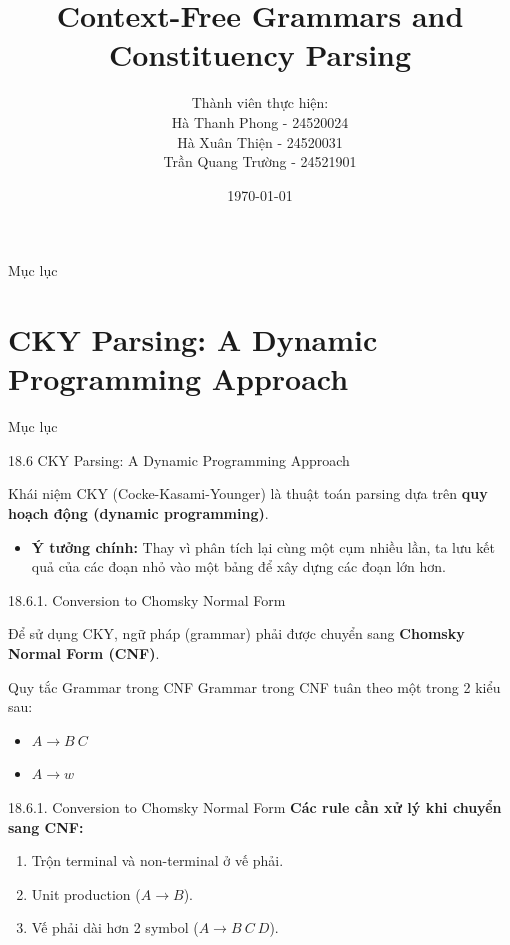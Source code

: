 \documentclass[11pt]{beamer}
\author[University of Information Technology]{Thành viên thực hiện: \\ Hà Thanh Phong - 24520024 \\ Hà Xuân Thiện - 24520031 \\ Trần Quang Trường - 24521901}
\title[Chaper 18]{Context-Free Grammars and Constituency Parsing}
\institute[]{University of Information Technology - VNUHCM}
\date{\today}
\begin{document}
	
	\begin{frame}
		\titlepage
	\end{frame}
	
	\begin{frame}{Mục lục}
		\tableofcontents[hideallsubsections]
	\end{frame}


	\section{CKY Parsing: A Dynamic Programming Approach}
	\begin{frame}{Mục lục}
		\tableofcontents[currentsection]
	\end{frame}

	\begin{frame}{18.6 CKY Parsing: A Dynamic Programming Approach}
		\begin{block}{Khái niệm}
			CKY (Cocke-Kasami-Younger) là thuật toán parsing dựa trên \textbf{quy hoạch động (dynamic programming)}.
		\end{block}
		\begin{itemize}
			\item \textbf{Ý tưởng chính:} Thay vì phân tích lại cùng một cụm nhiều lần, ta lưu kết quả của các đoạn nhỏ vào một bảng để xây dựng các đoạn lớn hơn.
		\end{itemize}
	\end{frame}
	
	\begin{frame}{18.6.1. Conversion to Chomsky Normal Form}
		
		Để sử dụng CKY, ngữ pháp (grammar) phải được chuyển sang \textbf{Chomsky Normal Form (CNF)}.
		\vspace{0.3cm}
		
		\begin{block}{Quy tắc Grammar trong CNF}
			Grammar trong CNF tuân theo một trong 2 kiểu sau:
			\begin{itemize}
				\item $A \rightarrow B\ C$
				\item $A \rightarrow w$
			\end{itemize}
		\end{block}
		
	\end{frame}

	\begin{frame}{18.6.1. Conversion to Chomsky Normal Form}
		\textbf{Các rule cần xử lý khi chuyển sang CNF:} 
		\begin{enumerate}
			\item Trộn terminal và non-terminal ở vế phải.
			\item Unit production ($A \rightarrow B$).
			\item Vế phải dài hơn 2 symbol ($A \rightarrow B \ C \ D$).
		\end{enumerate}
	\end{frame}
	
\end{document}
